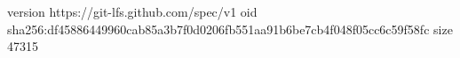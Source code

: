 version https://git-lfs.github.com/spec/v1
oid sha256:df45886449960cab85a3b7f0d0206fb551aa91b6be7cb4f048f05cc6c59f58fc
size 47315
